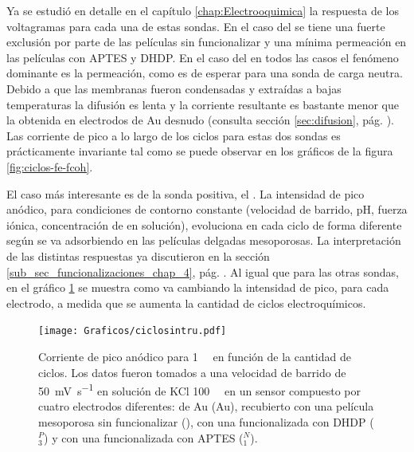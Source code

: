{	Ya se estudió en detalle en el capítulo \ref{chap:Electrooquimica} la respuesta de los voltagramas para cada una de estas sondas. En el caso del \fe\space se tiene una fuerte exclusión por parte de las películas sin funcionalizar y una mínima permeación en las películas con APTES y DHDP. 
	En el caso del \fc\space en todos las casos el fenómeno dominante es la permeación, como es de esperar para una sonda de carga neutra. Debido a que las membranas fueron condensadas y extraídas a bajas temperaturas la difusión es lenta y la corriente resultante es bastante menor que la obtenida en electrodos de Au desnudo (consulta sección \ref{sec:difusion}, pág. \pageref{sec:difusion}). Las corriente de pico a lo largo de los ciclos para estas dos sondas es prácticamente invariante tal como se puede observar en los gráficos de la figura \ref{fig:ciclos-fe-fcoh}.

	El caso más interesante es de la sonda positiva, el \ru. La intensidad de pico anódico, para condiciones de contorno constante (velocidad de barrido, pH, fuerza iónica, concentración de \ru\space en solución), evoluciona en cada ciclo de forma diferente según se va adsorbiendo en las películas delgadas mesoporosas. La interpretación de las distintas respuestas ya discutieron en la sección \ref{sub_sec_funcionalizaciones_chap_4}, pág. \pageref{sub_sec_funcionalizaciones_chap_4}. Al igual que para las otras sondas, en el gráfico \ref{fig:ruciclos}  se muestra como va cambiando la intensidad de pico, para cada electrodo, a medida que se aumenta la cantidad de ciclos electroquímicos. 

			\begin{figure}[ht!]
		 	       	\begin{center}
		 	       	\texttt{[image: Graficos/ciclosintru.pdf]}
		        	\caption[Corriente de pico de \ru\space en función del número de ciclos]{Corriente de pico anódico para \ru\space \SI{1}{\milli\Molar} en función de la cantidad de ciclos. Los datos fueron tomados a una velocidad de barrido de \SI{50}{\milli\volt\per\second} en solución de KCl \SI{100}{\milli\Molar} en un sensor compuesto por cuatro electrodos diferentes: de Au (Au), recubierto con una película mesoporosa sin funcionalizar (\pdmZ), con una funcionalizada con DHDP (\pdmZ$^P_3$) y con una funcionalizada con APTES (\pdmZ$^N_1$).}
		         	\label{fig:ruciclos}
		         	\end{center}
		     		\end{figure}
	
}
